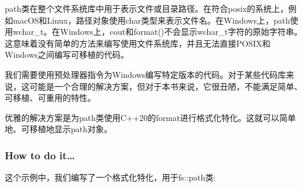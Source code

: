
path类在整个文件系统库中用于表示文件或目录路径。在符合posix的系统上，例如macOS和Linux，路径对象使用char类型来表示文件名。在Windows上，path使用wchar\_t。在Windows上，cout和format()不会显示wchar\_t字符的原始字符串。这意味着没有简单的方法来编写使用文件系统库，并且无法直接POSIX和Windows之间编写可移植的代码。

我们需要使用预处理器指令为Windows编写特定版本的代码。对于某些代码库来说，这可能是一个合理的解决方案，但对于本书来说，它很丑陋，不能满足简单、可移植、可重用的特性。

优雅的解决方案是为path类使用C++20的format进行格式化特化。这就可以简单地、可移植地显示path对象。

\subsubsection{How to do it…}

这个示例中，我们编写了一个格式化特化，用于fs::path类:

